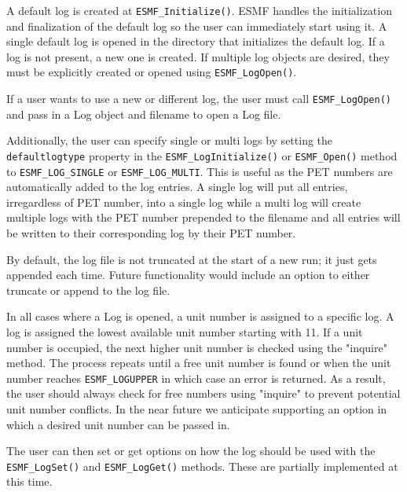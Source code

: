 

A default log is created at {\tt ESMF\_Initialize()}.  ESMF handles the 
initialization and finalization of the default log so the user can immediately
start using it.  A single default log is opened in the directory that 
initializes the default log.  If a log is not present, a new one is created.
If multiple log objects are desired, they must be explicitly created or opened 
using {\tt ESMF\_LogOpen()}.

If a user wants to use a new or different log, the user must call
{\tt ESMF\_LogOpen()} and pass in a Log object and filename to open a Log file.

Additionally,  the user can specify single or multi logs by setting the
{\tt defaultlogtype} property in the {\tt ESMF\_LogInitialize()} or 
{\tt ESMF\_Open()} method to {\tt ESMF\_LOG\_SINGLE} or {\tt ESMF\_LOG\_MULTI}.
This is useful as the PET numbers are automatically added to the log entries.
A single log will put all entries, irregardless of PET number, into a single
log while a multi log will create multiple logs with the PET number prepended
to the filename and all entries will be written to their corresponding log 
by their PET number.
 
By default, the log file is not truncated at the start of a new run; it just
gets appended each time.  Future functionality would include an option to
either truncate or append to the log file. 

In all cases where a Log is opened, a unit number is assigned to a specific
log.  A log is assigned the lowest available unit number starting with
11.  If a unit number is occupied, the next higher unit number is 
checked using the "inquire" method.  The process repeats until a free unit 
number is found or when the unit number reaches {\tt ESMF\_LOGUPPER} in 
which case an error is returned.  As a result, the user should always check
for free numbers using "inquire" to prevent potential unit number conflicts.
In the near future we anticipate supporting an option in which a desired
unit number can be passed in.

The user can then set or get options on how the log should be used 
with the {\tt ESMF\_LogSet()} and {\tt ESMF\_LogGet()} methods.  These are 
partially implemented at this time. 

